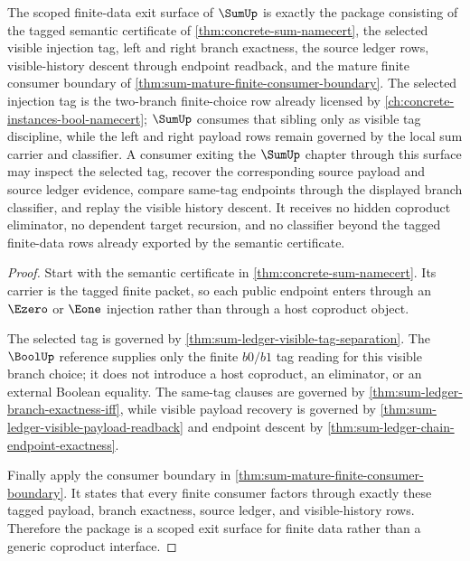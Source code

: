 \begin{theorem}
\label{thm:sum-finite-data-scoped-exit-package}
The scoped finite-data exit surface of $\SumUp$ is exactly the package consisting of the tagged semantic certificate of \autoref{thm:concrete-sum-namecert}, the selected visible injection tag, left and right branch exactness, the source ledger rows, visible-history descent through endpoint readback, and the mature finite consumer boundary of \autoref{thm:sum-mature-finite-consumer-boundary}. The selected injection tag is the two-branch finite-choice row already licensed by \autoref{ch:concrete-instances-bool-namecert}; $\SumUp$ consumes that sibling only as visible tag discipline, while the left and right payload rows remain governed by the local sum carrier and classifier. A consumer exiting the $\SumUp$ chapter through this surface may inspect the selected tag, recover the corresponding source payload and source ledger evidence, compare same-tag endpoints through the displayed branch classifier, and replay the visible history descent. It receives no hidden coproduct eliminator, no dependent target recursion, and no classifier beyond the tagged finite-data rows already exported by the semantic certificate.
\end{theorem}
\begin{proof}
Start with the semantic certificate in \autoref{thm:concrete-sum-namecert}. Its carrier is the tagged finite packet, so each public endpoint enters through an $\Ezero$ or $\Eone$ injection rather than through a host coproduct object.

The selected tag is governed by \autoref{thm:sum-ledger-visible-tag-separation}. The $\BoolUp$ reference supplies only the finite $b0/b1$ tag reading for this visible branch choice; it does not introduce a host coproduct, an eliminator, or an external Boolean equality. The same-tag clauses are governed by \autoref{thm:sum-ledger-branch-exactness-iff}, while visible payload recovery is governed by \autoref{thm:sum-ledger-visible-payload-readback} and endpoint descent by \autoref{thm:sum-ledger-chain-endpoint-exactness}.

Finally apply the consumer boundary in \autoref{thm:sum-mature-finite-consumer-boundary}. It states that every finite consumer factors through exactly these tagged payload, branch exactness, source ledger, and visible-history rows. Therefore the package is a scoped exit surface for finite data rather than a generic coproduct interface.
\end{proof}

